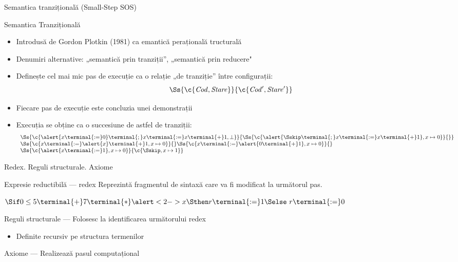 \documentclass[xcolor=pdftex,romanian,colorlinks]{beamer}
\begin{document}
\begin{section}{Semantica tranzițională (Small-Step SOS)}
  \begin{frame}{Semantica Tranzițională}
  \begin{itemize}
  \item Introdusă de Gordon Plotkin (1981) ca emantică perațională tructurală
  \item Denumiri alternative: „semantică prin tranziții”, „semantică prin reducere"
  \item Definește cel mai mic pas de execuție ca o relație „de tranziție” între configurații:
  $$\Ss{\c{{\it Cod}, {\it Stare}}}{\c{{\it Cod'}, {\it Stare'}}}$$
  \item Fiecare pas de execuție este concluzia unei demonstrații
  \item Execuția se obține ca o succesiune de astfel de tranziții:
  $$\begin{array}{l}\Ss{\c{\alert{x \terminal{:=} 0} \terminal{;}  x \terminal{:=} x \terminal{+} 1 ,\bot}}{\Ss{\c{\alert{\Sskip \terminal{;}x \terminal{:=} x \terminal{+} 1} ,x \mapsto 0}}{}}
\\
  {\Ss{\c{x \terminal{:=} \alert{x} \terminal{+} 1 ,x \mapsto 0}}{}}
  {\Ss{\c{x \terminal{:=} \alert{0 \terminal{+} 1} ,x \mapsto 0}}{}}
  \\
  {\Ss{\c{\alert{x \terminal{:=} 1 },x \mapsto 0}}{{\c{\Sskip,x \mapsto 1}}}}
  \end{array}$$
  \end{itemize}
  \end{frame}

  \begin{frame}{Redex. Reguli structurale. Axiome}
  \begin{block}{\alert{Ex}presie \alert{red}uctibilă --- \alert{redex}}
  Reprezintă fragmentul de sintaxă care va fi modificat la următorul pas.

  \hfill$\Sif 0 \leq 5 \terminal{+} 7 \terminal{*} \alert<2->{x} \Sthen r \terminal{:=}1 \Selse\ r \terminal{:=}0 $\hfill\
  \end{block}

  \begin{block}{Reguli structurale --- Folosesc la identificarea următorului redex}
  \begin{itemize}
  \item Definite recursiv pe structura termenilor
  \end{itemize}
  \end{block}
  \begin{block}{Axiome --- Realizează pasul computațional}
  \onslide<4>{$$\reg{\Ss{\c{\Sif {\terminal{true}}\Sthen {\it bl}_1 \Selse {\it bl}_2,\sigma}}{\c{{\it bl}_1,\sigma}}}{}{}$$}
  \end{block}
  \end{frame}
  \end{section}
\end{document}
